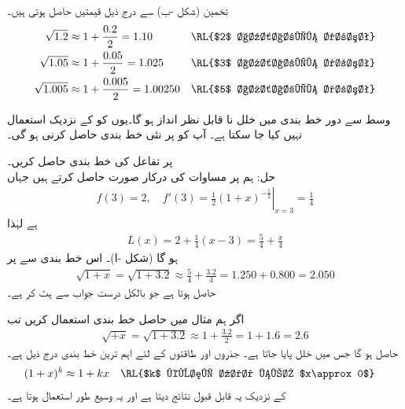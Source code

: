 تخمین  (شکل -ب) سے درج ذیل قیمتیں حاصل ہوتی ہیں۔
\begin{align*}
\sqrt{1.2}&\approx 1+\frac{0.2}{2}=1.10&& \text{\RL{$2$ اعشاریہ درست}}\\
\sqrt{1.05}&\approx 1+\frac{0.05}{2}=1.025&& \text{\RL{$3$ اعشاریہ درست}}\\
\sqrt{1.005}&\approx 1+\frac{0.005}{2}=1.00250&& \text{\RL{$5$ اعشاریہ درست}}\\
\end{align*}

وسط سے دور خط بندی میں خلل نا قابل نظر انداز ہو گا۔یوں  کو  کے نزدیک استعمال نہیں کیا جا سکتا ہے۔ آپ کو  پر نئی خط بندی حاصل کرنی ہو گی۔

 پر تفاعل  کی خط بندی حاصل کریں۔ \\
حل:\quad
ہم  پر مساوات  کی درکار صورت حاصل کرتے ہیں جہاں
\begin{align*}
f(3)=2,\quad f'(3)=\left.\frac{1}{2}(1+x)^{-\tfrac{1}{2}}\right|_{x=3}=\frac{1}{4}
\end{align*}
ہے لہٰذا
\begin{align*}
L(x)=2+\frac{1}{4}(x-3)=\frac{5}{4}+\frac{x}{4}
\end{align*}
ہو گا (شکل -ا)۔ اس خط بندی سے  پر 
\begin{align*}
\sqrt{1+x}=\sqrt{1+3.2}\approx \frac{5}{4}+\frac{3.2}{4}=1.250+0.800=2.050
\end{align*}
حاصل ہوتا ہے جو بالکل درست جواب  سے  ہٹ کر ہے۔

اگر ہم مثال  میں حاصل خط بندی استعمال کریں تب 
\begin{align*}
\sqrt{+x}=\sqrt{1+3.2}\approx 1+\frac{3.2}{2}=1+1.6=2.6
\end{align*}
حاصل ہو گا جس میں  خلل پایا جاتا ہے۔
جذروں اور طاقتوں کے لئے اہم ترین خط بندی درج ذیل ہے۔
\begin{align}\label{مساوات_استعمال_طاقت_خطی_تخمین}
(1+x)^k&\approx 1+kx&&\text{\RL{$k$ کوئی عدد ہے؛ $x\approx 0$}}
\end{align}
 کے نزدیک یہ قابل قبول نتائج دیتا ہے اور یہ وسیع طور استعمال ہوتا ہے۔

